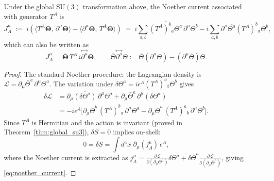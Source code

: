 \begin{theorem}
  \label{thm:noether_current}
  Under the global $\mathrm{SU}(3)$ transformation above, the Noether current
  associated with generator $T^A$ is
  \begin{equation}
    \label{eq:noether_current}
    J_A^\mu
    \;:=\;
    i\!\left(
      \langle T^A\boldsymbol{\Theta},\,\partial^\mu\boldsymbol{\Theta}\rangle
      -
      \langle\partial^\mu\boldsymbol{\Theta},\,T^A\boldsymbol{\Theta}\rangle
    \right)
    \;=\;
    i\sum_{a,b}\overline{(T^A)^b{}_a\Theta^a}\,\partial^\mu\Theta^b
    - i\sum_{a,b}\partial^\mu\overline{\Theta^a}(T^A)^b{}_a\Theta^b,
  \end{equation}
  which can also be written as
  \begin{equation}
    J_A^\mu
    = \bar{\boldsymbol{\Theta}}\, T^A \,i\overset{\leftrightarrow}{\partial^\mu}\boldsymbol{\Theta},
    \qquad
    \bar{\Theta}\overset{\leftrightarrow}{\partial^\mu}\Theta
    := \bar\Theta(\partial^\mu\Theta) - (\partial^\mu\bar\Theta)\Theta.
  \end{equation}
\end{theorem}

\begin{proof}
  The standard Noether procedure: the Lagrangian density is
  $\mathcal{L} = \partial_\mu\bar\Theta^a\,\partial^\mu\Theta^a$.
  The variation under $\delta\Theta^a = i\epsilon^A(T^A)^a{}_b\Theta^b$ gives
  \begin{align}
    \delta\mathcal{L}
    &= \partial_\mu\overline{(\delta\Theta^a)}\,\partial^\mu\Theta^a
      + \partial_\mu\bar\Theta^a\,\partial^\mu(\delta\Theta^a)
    \nonumber\\
    &= -i\epsilon^A
      \bigl[
        \partial_\mu\bar\Theta^b\,(T^A)^b{}_a\,\partial^\mu\Theta^a
        - \partial_\mu\bar\Theta^a\,(T^A)^a{}_b\,\partial^\mu\Theta^b
      \bigr].
  \end{align}
  Since $T^A$ is Hermitian and the action is invariant (proved in
  Theorem~\ref{thm:global_su3}), $\delta S=0$ implies on-shell:
  \begin{equation}
    0 = \delta S = \int d^4x\;\partial_\mu(j^\mu_A)\,\epsilon^A,
  \end{equation}
  where the Noether current is extracted as
  $j^\mu_A = \frac{\partial\mathcal{L}}{\partial(\partial_\mu\Theta^a)}\delta\Theta^a
  + \delta\bar\Theta^a\frac{\partial\mathcal{L}}{\partial(\partial_\mu\bar\Theta^a)}$,
  giving \eqref{eq:noether_current}.
\end{proof}

